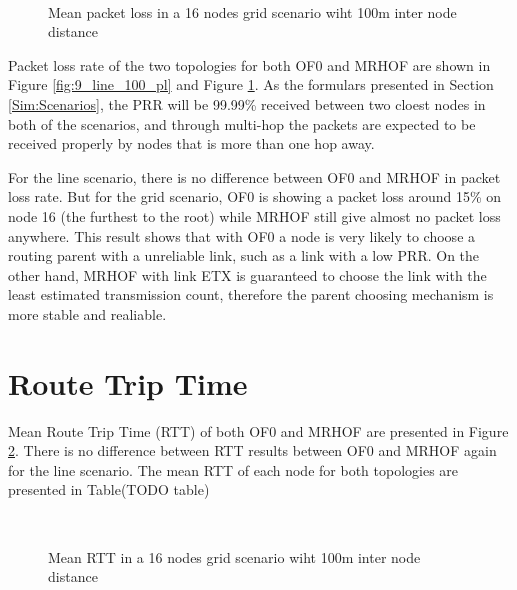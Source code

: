 \begin{figure}[htbp]
  \begin{center}
    \leavevmode
    \\
    \caption{Mean packet loss in a 16 nodes grid scenario wiht 100m inter node distance}
    \label{fig:16_grid_100_pl}
  \end{center}
\end{figure}

Packet loss rate of the two topologies for both OF0 and MRHOF are shown in Figure \ref{fig:9_line_100_pl} and Figure \ref{fig:16_grid_100_pl}. As the formulars presented in Section \ref{Sim:Scenarios}, the PRR will be 99.99\% received between two cloest nodes in both of the scenarios, and through multi-hop the packets are expected to be received properly by nodes that is more than one hop away.   
\newline 

For the line scenario, there is no difference between OF0 and MRHOF in packet loss rate. But for the grid scenario, OF0 is showing a packet loss around 15\%  on node 16 (the furthest to the root) while MRHOF still give almost no packet loss anywhere. This result shows that with OF0 a node is very likely to choose a routing parent with a unreliable link, such as a link with a low PRR. On the other hand, MRHOF with link ETX is guaranteed to choose the link with the least estimated transmission count, therefore the parent choosing mechanism is more stable and realiable. 

\section{Route Trip Time}
\label{RTT}

Mean Route Trip Time (RTT) of both OF0 and MRHOF are presented in Figure \ref{fig:rtt}. There is no difference between RTT results between OF0 and MRHOF again for the line scenario. The mean RTT  of each node for both topologies are presented in Table(TODO table)
\begin{figure}[htbp]
  \begin{center}
    \leavevmode
    \\
    \caption{Mean RTT in a 16 nodes grid scenario wiht 100m inter node distance}
    \label{fig:rtt}
  \end{center}
\end{figure} 




